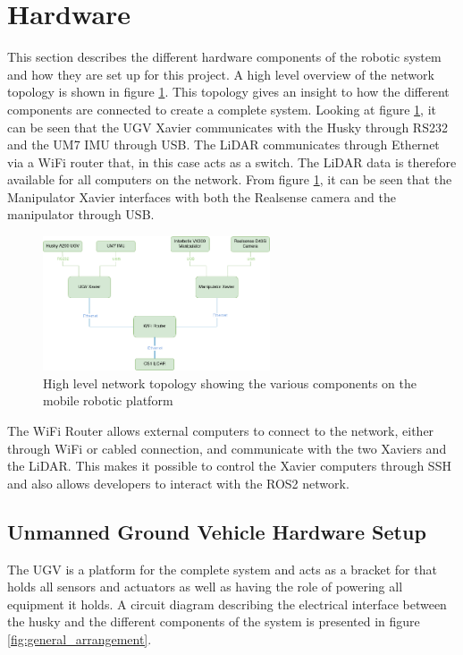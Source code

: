\section{Hardware}
This section describes the different hardware components of the robotic system and how they are set up for this project. A high level overview of the network topology is shown in figure \ref{fig:topology}. This topology gives an insight to how the different components are connected to create a complete system. Looking at figure \ref{fig:topology}, it can be seen that the UGV Xavier communicates with the Husky through RS232 and the UM7 IMU through USB. The LiDAR communicates through Ethernet via a WiFi router that, in this case acts as a switch. The LiDAR data is therefore available for all computers on the network. From figure \ref{fig:topology}, it can be seen that the Manipulator Xavier interfaces with both the Realsense camera and the manipulator through USB. 

\begin{figure}[H]
  \centering
  \includegraphics[width = 0.6\textwidth]{Figures/example_figure.drawio.png}
  \caption{High level network topology showing the various components on the mobile robotic platform}
  \label{fig:topology}
\end{figure}

The WiFi Router allows external computers to connect to the network, either through WiFi or cabled connection, and communicate with the two Xaviers and the LiDAR. This makes it possible to control the Xavier computers through SSH and also allows developers to interact with the ROS2 network.

\subsection{Unmanned Ground Vehicle Hardware Setup}
The UGV is a platform for the complete system and acts as a bracket for that holds all sensors and actuators as well as having the role of powering all equipment it holds. A circuit diagram describing the electrical interface between the husky and the different components of the system is presented in figure \ref{fig:general_arrangement}.

